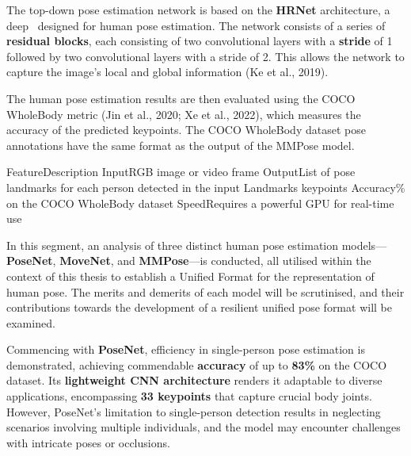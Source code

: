The top-down pose estimation network is based on the {\bf HRNet} architecture, a deep \CNN\ designed for human pose estimation. The network consists of a series of {\bf residual blocks}, each consisting of two convolutional layers with a {\bf stride} of 1 followed by two convolutional layers with a stride of 2. This allows the network to capture the image's local and global information (\scc Ke et al., 2019).

The human pose estimation results are then evaluated using the COCO WholeBody metric (\scc Jin et al., 2020; \scc Xe et al., 2022), which measures the accuracy of the predicted keypoints. The COCO WholeBody dataset pose annotations have the same format as the output of the MMPose model.

 \setupTABLE[r][1][style=bold]
 \setupTABLE[c][each][offset=3dd]
 \setupTABLE[frame=off]
 \setupTABLE[r][1][topframe=on,bottomframe=on]
 \setupTABLE[c][each][leftframe=on]
 \setupTABLE[c][1][leftframe=off]
 \bTR
 \bTD Feature\eTD\bTD Description\eTD\eTR
 \bTR
 \bTD Input\eTD\bTD RGB image or video frame\eTD\eTR
 \bTR
 \bTD Output\eTD\bTD List of pose landmarks for each person detected in the input\eTD\eTR
 \bTR
 \bTD Landmarks\eTD{} keypoints\eTD\eTR
 \bTR
 \bTD Accuracy\eTD{}\% on the COCO WholeBody dataset\eTD\eTR
 \bTR
 \bTD Speed\eTD\bTD Requires a powerful GPU for real-time use\eTD\eTR


In this segment, an analysis of three distinct human pose estimation models—{\bf PoseNet}, {\bf MoveNet}, and {\bf MMPose}—is conducted, all utilised within the context of this thesis to establish a Unified Format for the representation of human pose. The merits and demerits of each model will be scrutinised, and their contributions towards the development of a resilient unified pose format will be examined.

Commencing with {\bf PoseNet}, efficiency in single-person pose estimation is demonstrated, achieving commendable {\bf accuracy} of up to {\bf 83\%} on the COCO dataset. Its {\bf lightweight CNN architecture} renders it adaptable to diverse applications, encompassing {\bf 33 keypoints} that capture crucial body joints. However, PoseNet's limitation to single-person detection results in neglecting scenarios involving multiple individuals, and the model may encounter challenges with intricate poses or occlusions.

